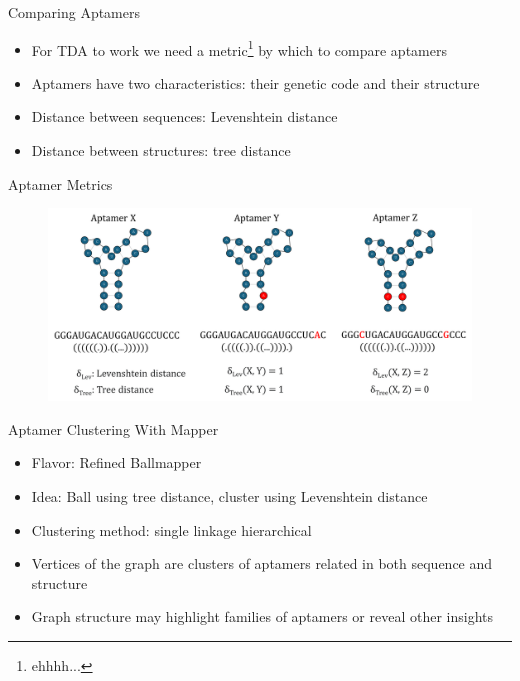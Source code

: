 \documentclass{beamer}
\begin{document}
\begin{frame}{Comparing Aptamers}
  \begin{itemize}
    \item For TDA to work we need a metric\footnote{ehhhh...} by which to compare aptamers
    \item Aptamers have two characteristics: their genetic code and their structure
    \item Distance between sequences: Levenshtein distance
    \item Distance between structures: tree distance
  \end{itemize}
\end{frame}

\begin{frame}{Aptamer Metrics}
  \begin{figure}
    \begin{center}
      \hspace*{-.75cm}\includegraphics[width=1.15\textwidth]{aptamers.png}
    \end{center}
  \end{figure}
\end{frame}

\begin{frame}{Aptamer Clustering With Mapper}
  \begin{itemize}
    \item Flavor: Refined Ballmapper
    \item Idea: Ball using tree distance, cluster using Levenshtein distance
    \item Clustering method: single linkage hierarchical
    \item Vertices of the graph are clusters of aptamers related in both sequence and structure
    \item Graph structure may highlight families of aptamers or reveal other insights
  \end{itemize}
\end{frame}
\end{document}
